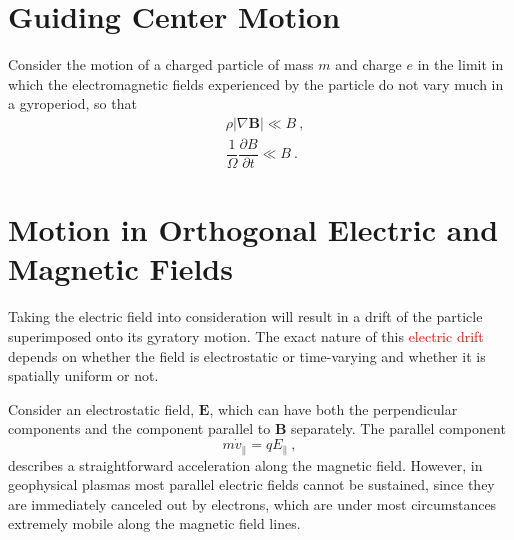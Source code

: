 \documentclass[12pt,a4paper]{article}
\renewcommand{\vec}[1]{\boldsymbol{#1}}
\begin{document}
\section{Guiding Center Motion}
\cite{Plasma2014} Consider the motion of a charged particle of mass $m$ and charge $e$ in the limit in which the electromagnetic fields experienced by the particle do not vary much in a gyroperiod, so that
\begin{align}
& \rho |\nabla \vec{B}| \ll B ~, \\
& \dfrac{1}{\Omega} \dfrac{\partial B}{\partial t}  \ll B ~.
\end{align}



\section{Motion in Orthogonal Electric and Magnetic Fields}
\cite{1996bspp.book.....B} Taking the electric field into consideration will result in a drift of the particle superimposed onto its gyratory motion. The exact nature of this \textcolor{red}{electric drift} depends on whether the field is electrostatic or time-varying and whether it is spatially uniform or not.

Consider an electrostatic field, $\vec{E}$, which can have both the perpendicular components and the component parallel to $\vec{B}$ separately. The parallel component
\begin{equation}
m \dot{v}_\parallel = q E_\parallel ~,
\end{equation}
describes a straightforward acceleration along the magnetic field. However, in geophysical plasmas most parallel electric fields cannot be sustained, since they are immediately canceled out by electrons, which are under most circumstances extremely mobile along the magnetic field lines.
\end{document}
